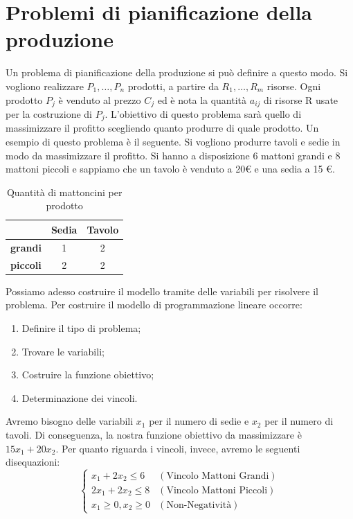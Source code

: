 \section{Problemi di pianificazione della produzione}
Un problema di pianificazione della produzione si può definire a questo modo. 
Si vogliono realizzare $P_1,\dots,P_n$ prodotti, a partire da $R_1,\dots,R_m$ risorse. Ogni prodotto $P_j$ è venduto al prezzo $C_j$ ed è nota la quantità $a_{ij}$ di risorse R usate per la costruzione di $P_j$. L'obiettivo di questo problema sarà quello di massimizzare il profitto scegliendo quanto produrre di quale prodotto.
Un esempio di questo problema è il seguente. Si vogliono produrre tavoli e sedie in modo da massimizzare il profitto. Si hanno a disposizione 6 mattoni grandi e 8 mattoni piccoli e sappiamo che un tavolo è venduto a 20€ e una sedia a 15 €. 
\begin{table}[H]
    \centering
    \begin{tabular}{|c|c|c|}
        \hline
        & \textbf{Sedia} & \textbf{Tavolo} \\
        \hline
        \textbf{grandi} & 1 & 2 \\
        \hline
        \textbf{piccoli} & 2 & 2 \\
        \hline
    \end{tabular}
    \caption{Quantità di mattoncini per prodotto}
    \label{tab:mobili_dimensione}
\end{table}

Possiamo adesso costruire il modello tramite delle variabili per risolvere il problema. Per costruire il modello di programmazione lineare occorre:
\begin{enumerate}
    \item Definire il tipo di problema;
    \item Trovare le variabili;
    \item Costruire la funzione obiettivo;
    \item Determinazione dei vincoli.
\end{enumerate}

Avremo bisogno delle variabili $x_1$ per il numero di sedie e $x_2$ per il numero di tavoli. Di conseguenza, la nostra funzione obiettivo da massimizzare è $15x_1+20x_2$.
Per quanto riguarda i vincoli, invece, avremo le seguenti disequazioni:
\begin{equation*}
    \begin{cases}
        x_1 + 2x_2 \le 6 & (\text{Vincolo Mattoni Grandi}) \\
        2x_1 + 2x_2 \le 8 & (\text{Vincolo Mattoni Piccoli}) \\
        x_1 \ge 0, x_2 \ge 0 & (\text{Non-Negatività})
    \end{cases}
\end{equation*}

